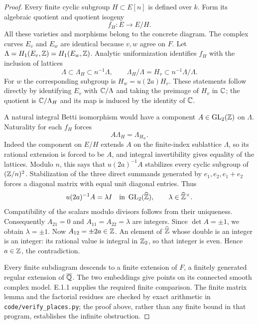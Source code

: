 \begin{proof}
Every finite cyclic subgroup $H\subset E[n]$ is defined over $k$. Form its algebraic quotient and quotient isogeny
\[
 f_H:E\longrightarrow E/H.
\]
All these varieties and morphisms belong to the concrete diagram. The complex curves $E_v$ and $E_w$ are identical because $v,w$ agree on $F$. Let $\Lambda=H_1(E_v,\mathbb Z)=H_1(E_w,\mathbb Z)$. Analytic uniformization identifies $f_H$ with the inclusion of lattices
\[
 \Lambda\subset\Lambda_H\subset n^{-1}\Lambda,
 \qquad \Lambda_H/\Lambda=H_v\subset n^{-1}\Lambda/\Lambda.
\]
For $w$ the corresponding subgroup is $H_w=u(2a)H_v$. These statements follow directly by identifying $E_v$ with $\mathbb C/\Lambda$ and taking the preimage of $H_v$ in $\mathbb C$; the quotient is $\mathbb C/\Lambda_H$ and its map is induced by the identity of $\mathbb C$.

A natural integral Betti isomorphism would have a component $A\in\operatorname{GL}_2(\mathbb Z)$ on $\Lambda$. Naturality for each $f_H$ forces
\[
 A\Lambda_H=\Lambda_{H_w}.
\]
Indeed the component on $E/H$ extends $A$ on the finite-index sublattice $\Lambda$, so its rational extension is forced to be $A$, and integral invertibility gives equality of the lattices. Modulo $n$, this says that $u(2a)^{-1}A$ stabilizes every cyclic subgroup of $(\mathbb Z/n)^2$. Stabilization of the three direct summands generated by $e_1,e_2,e_1+e_2$ forces a diagonal matrix with equal unit diagonal entries. Thus
\[
 u(2a)^{-1}A=\lambda I\quad\hbox{in }\operatorname{GL}_2(\widehat{\mathbb Z}),
 \qquad \lambda\in\widehat{\mathbb Z}^{\times}.
\]
Compatibility of the scalars modulo divisors follows from their uniqueness. Consequently $A_{21}=0$ and $A_{11}=A_{22}=\lambda$ are integers. Since $\det A=\pm1$, we obtain $\lambda=\pm1$. Now $A_{12}=\pm2a\in\mathbb Z$. An element of $\widehat{\mathbb Z}$ whose double is an integer is an integer: its rational value is integral in $\mathbb Z_2$, so that integer is even. Hence $a\in\mathbb Z$, the contradiction.

Every finite subdiagram descends to a finite extension of $F$, a finitely generated regular extension of $\overline{\mathbb Q}$. The two embeddings give points on its connected smooth complex model. E.1.1 supplies the required finite comparison. The finite matrix lemma and the factorial residues are checked by exact arithmetic in \texttt{code/verify\_places.py}; the proof above, rather than any finite bound in that program, establishes the infinite obstruction.
\end{proof}

